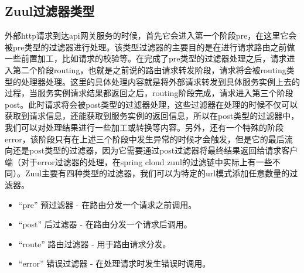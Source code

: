 \documentclass[../../../interview-questions.tex]{subfiles}
\begin{document}
\subsection{Zuul过滤器类型}

外部http请求到达api网关服务的时候，首先它会进入第一个阶段pre，在这里它会被pre类型的过滤器进行处理。该类型过滤器的主要目的是在进行请求路由之前做一些前置加工，比如请求的校验等。在完成了pre类型的过滤器处理之后，请求进入第二个阶段routing，也就是之前说的路由请求转发阶段，请求将会被routing类型的处理器处理。这里的具体处理内容就是将外部请求转发到具体服务实例上去的过程，当服务实例请求结果都返回之后，routing阶段完成，请求进入第三个阶段post。此时请求将会被post类型的过滤器处理，这些过滤器在处理的时候不仅可以获取到请求信息，还能获取到服务实例的返回信息，所以在post类型的过滤器中，我们可以对处理结果进行一些加工或转换等内容。另外，还有一个特殊的阶段error，该阶段只有在上述三个阶段中发生异常的时候才会触发，但是它的最后流向还是post类型的过滤器，因为它需要通过post过滤器将最终结果返回给请求客户端（对于error过滤器的处理，在spring cloud zuul的过滤链中实际上有一些不同）。Zuul主要有四种类型的过滤器，我们可以为特定的url模式添加任意数量的过滤器。

\begin{itemize}
    \item {“pre” 预过滤器 - 在路由分发一个请求之前调用。}
    \item {“post” 后过滤器 - 在路由分发一个请求后调用。}
    \item {“route” 路由过滤器 - 用于路由请求分发。}
    \item {“error” 错误过滤器 - 在处理请求时发生错误时调用。}
\end{itemize}
\end{document}
